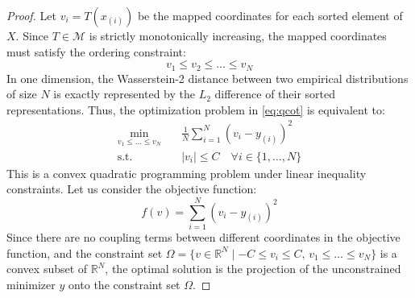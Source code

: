 \documentclass{article}
\theoremstyle{plain}
\theoremstyle{definition}
\theoremstyle{remark}
\begin{document}
\begin{proof}
Let $v_i = T(x_{(i)})$ be the mapped coordinates for each sorted element of $X$. Since $T \in \mathcal{M}$ is strictly monotonically increasing, the mapped coordinates must satisfy the ordering constraint:
\begin{equation}
    v_1 \le v_2 \le \dots \le v_N
\end{equation}
In one dimension, the Wasserstein-2 distance between two empirical distributions of size $N$ is exactly represented by the $L_2$ difference of their sorted representations. Thus, the optimization problem in \cref{eq:qcot} is equivalent to:
\begin{align}
    \min_{v_1 \le \dots \le v_N} \quad & \frac{1}{N} \sum_{i=1}^N (v_i - y_{(i)})^2 \\
    \text{s.t.} \quad & |v_i| \le C \quad \forall i \in \{1, \dots, N\}
\end{align}
This is a convex quadratic programming problem under linear inequality constraints. Let us consider the objective function:
\begin{equation}
    f(v) = \sum_{i=1}^N (v_i - y_{(i)})^2
\end{equation}
Since there are no coupling terms between different coordinates in the objective function, and the constraint set $\Omega = \{v \in \mathbb{R}^N \mid -C \le v_i \le C, \, v_1 \le \dots \le v_N\}$ is a convex subset of $\mathbb{R}^N$, the optimal solution is the projection of the unconstrained minimizer $y$ onto the constraint set $\Omega$.


\end{proof}
\end{document}
